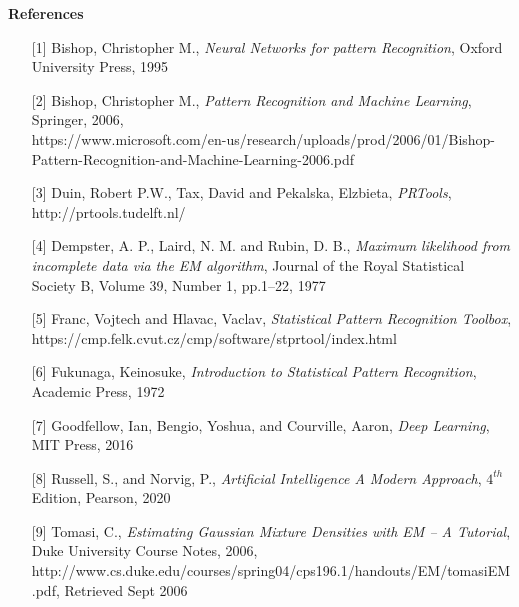 \documentclass{article}
\begin{document}
\begin{enumerate}
    
    \vspace{5mm}
    
    \pagebreak
    

\textbf{References}

\begin{enumerate} 
	\item[{[1]}] Bishop, Christopher M., \textit{Neural Networks for pattern Recognition}, Oxford University Press, 1995 
	\item[{[2]}] Bishop, Christopher M., \textit{Pattern Recognition and Machine Learning}, Springer, 2006, \\
	https://www.microsoft.com/en-us/research/uploads/prod/2006/01/Bishop-Pattern-Recognition-and-Machine-Learning-2006.pdf
	\item[{[3]}] Duin, Robert P.W., Tax, David and Pekalska, Elzbieta, \textit{PRTools}, http://prtools.tudelft.nl/
	\item[{[4]}] Dempster, A. P., Laird, N. M. and Rubin, D. B., \textit{Maximum likelihood from incomplete data via the EM algorithm}, Journal of the Royal Statistical Society B, Volume 39, Number 1, pp.1–22, 1977
	\item[{[5]}] Franc, Vojtech and Hlavac, Vaclav, \textit{Statistical Pattern Recognition Toolbox}, \newline https://cmp.felk.cvut.cz/cmp/software/stprtool/index.html
	\item[{[6]}] Fukunaga, Keinosuke, \textit{Introduction to Statistical Pattern Recognition}, Academic Press, 1972 
	\item[{[7]}] Goodfellow, Ian, Bengio, Yoshua, and Courville, Aaron, \textit{Deep Learning}, MIT Press, 2016
	\item[{[8]}] Russell, S., and Norvig, P., \textit{Artificial Intelligence A Modern Approach}, $4^{th}$ Edition, Pearson, 2020
	\item[{[9]}] Tomasi, C., \textit{Estimating Gaussian Mixture Densities with EM – A Tutorial}, Duke University Course Notes, 2006, http://www.cs.duke.edu/courses/spring04/cps196.1/handouts/EM/tomasiEM.pdf, Retrieved Sept 2006
\end{enumerate}



\end{enumerate}
\end{document}
